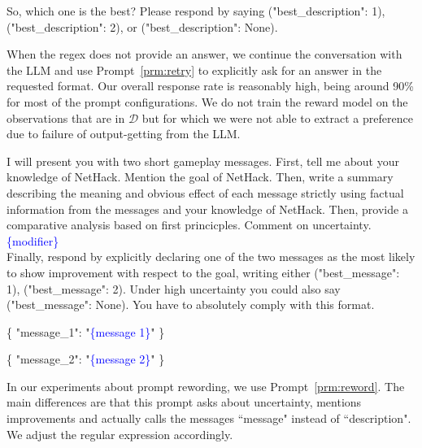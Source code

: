 \documentclass{article} %
\begin{document}
\begin{prompt}[h]
    \centering
\begin{mymessagebox}[frametitle=Retry prompt]
\small{}\selectfont
So, which one is the best? Please respond by saying ("best\_description": 1), ("best\_description": 2), or ("best\_description": None).
\end{mymessagebox}
\caption{Prompt provided to the LLM to continue the conversation when the regular expression does not find a valid annotation in the LLM's answer to the original prompt.}
\label{prm:retry}
\end{prompt}
When the regex does not provide an answer, we continue the conversation with the LLM and use Prompt~\ref{prm:retry} to explicitly ask for an answer in the requested format.
Our overall response rate is reasonably high, being around 90\% for most of the prompt configurations.
We do not train the reward model on the observations that are in $\mathcal D$ but for which we were not able to extract a preference due to failure of output-getting from the LLM.

\begin{prompt}[h]
\begin{mymessagebox}[frametitle=Reworded prompt]
\small{}\selectfont
I will present you with two short gameplay messages. 
First, tell me about your knowledge of NetHack. Mention the goal of NetHack. 
Then, write a summary describing the meaning and obvious effect of each message strictly using factual information from the messages and your knowledge of NetHack. 
Then, provide a comparative analysis based on first princicples. Comment on uncertainty. \textcolor{blue}{\{modifier\}} \\

Finally, respond by explicitly declaring one of the two messages as the most likely to show improvement with respect to the goal, writing either ("best\_message": 1), ("best\_message": 2). Under high uncertainty you could also say ("best\_message": None). You have to absolutely comply with this format.

\{
"message\_1":
"\textcolor{blue}{\{message 1\}}"
\}

\{
"message\_2":
"\textcolor{blue}{\{message 2\}}"
\}
\end{mymessagebox}
\caption{Semantically-similar variation of Prompt~\ref{prm:base}, used for the experiment in Figure~\ref{fig:oracle_prompts}.}
\label{prm:reword}
\end{prompt}
In our experiments about prompt rewording, we use Prompt~\ref{prm:reword}. The main differences are that this prompt asks about uncertainty, mentions improvements and actually calls the messages ``message" instead of ``description". We adjust the regular expression accordingly.
\end{document}
